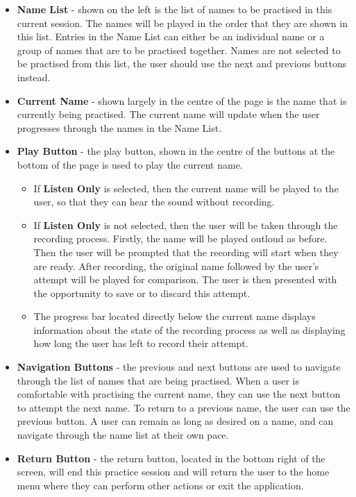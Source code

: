 \documentclass{article}
\begin{document}
\begin{itemize}
	\item \textbf{Name List} - shown on the left is the list of names to be practised in this current session. The names will be played in the order that 
they are shown in this list. Entries in the Name List can either be an individual name or a group of names that are to 
be practised together. Names are not selected to be practised from this list, the user should use the next and previous buttons instead.

	\item \textbf{Current Name} - shown largely in the centre of the page is the name that is currently being practised. The current name
will update when the user progresses through the names in the Name List.

	\item \textbf{Play Button} - the play button, shown in the centre of the buttons at the bottom of the page is used to play the current name.

	\begin{itemize}
		\item If \textbf{Listen Only} is selected, then the current name will be played to the user, so that they can hear the sound without recording.

		\item If \textbf{Listen Only} is not selected, then the user will be taken through the recording process. Firstly, the name will be played outloud
    as before. Then the user will be prompted that the recording will start when they are ready. After recording, the original name 
    followed by the user's attempt will be played for comparison. The user is then presented with the opportunity to save or to discard
    this attempt.

    	\item The progress bar located directly below the current name displays information about the state of the recording process
    as well as displaying how long the user has left to record their attempt.
	\end{itemize}

	\item \textbf{Navigation Buttons} - the previous and next buttons are used to navigate through the list of names that are being 
practised. When a user is comfortable with practising the current name, they can use the next button to attempt the next name. 
To return to a previous name, the user can use the previous button. A user can remain as long as desired on a name, and can 
navigate through the name list at their own pace.

	\item \textbf{Return Button} - the return button, located in the bottom right of the screen, will end this practice session and will
return the user to the home menu where they can perform other actions or exit the application.


\end{itemize}
\end{document}
